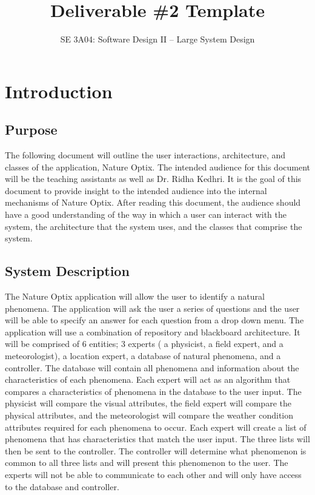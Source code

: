 \documentclass[]{article}
\title{Deliverable \#2 Template}
\author{SE 3A04: Software Design II -- Large System Design}
\date{}
\begin{document}
\maketitle	

\section{Introduction}
\label{sec:introduction}



\subsection{Purpose}
\label{sub:purpose}
The following document will outline the user interactions, architecture, and classes of the application, Nature Optix.  The intended audience for this document will be the teaching assistants as well as Dr. Ridha Kedhri. It is the goal of this document to provide insight to the intended audience into the internal mechanisms of Nature Optix. After reading this document, the audience should have a good understanding of the way in which a user can interact with the system, the architecture that the system uses, and the classes that comprise the system. 

\subsection{System Description}
\label{sub:system_description}
The Nature Optix application will allow the user to identify a natural phenomena. The application will ask the user a series of questions and the user will be able to specify an answer for each question from a drop down menu. The application will use a combination of repository and blackboard architecture. It will be comprised of 6 entities; 3 experts ( a physicist, a field expert, and a meteorologist), a location expert, a database of natural phenomena, and a controller. The database will contain all phenomena and information about the characteristics of each phenomena. Each expert will act as an algorithm that compares a characteristics of phenomena in the database to the user input. The physicist will compare the visual attributes, the field expert will compare the physical attributes, and the meteorologist will compare the weather condition attributes required for each phenomena to occur. Each expert will create a list of phenomena that has characteristics that match the user input. The three lists will then be sent to the controller. The controller will determine what phenomenon is common to all three lists and will present this phenomenon to the user. The experts will not be able to communicate to each other and will only have access to the database and controller. 
\end{document}
